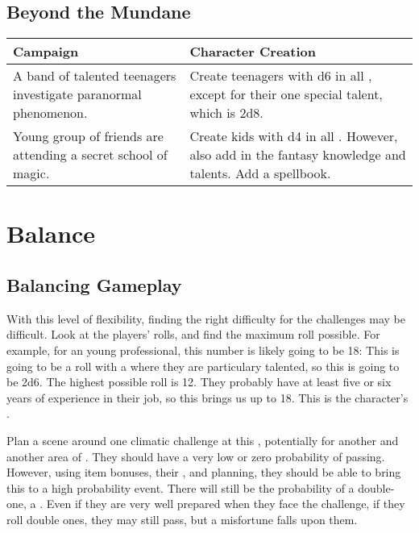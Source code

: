 \documentclass{LegrandOrangeTufteBook}
\begin{document}
\subsection*{Beyond the Mundane}
\begin{center}
	\begin{xltabular}{\textwidth}{XX}
		Campaign & Character Creation \\
		\hline
{}    A band of talented teenagers investigate paranormal phenomenon. & Create teenagers with d6 in all , except for their one special talent, which is 2d8.\\
   				Young group of friends are attending a secret school of magic. & Create kids with d4 in all . However, also add in the fantasy knowledge and talents. Add a spellbook. \\

	\end{xltabular}
\end{center}

\section*{Balance}

\subsection*{Balancing Gameplay}

With this level of flexibility, finding the right difficulty for the challenges may be difficult. Look at the players' rolls, and find the maximum roll possible. For example, for an young professional,
this number is likely going to be 18: This is going to be a roll with a  where they are particulary talented, so this is going to be 2d6. The highest possible roll is 12. They probably have at least five or six years of experience in their job, so this brings us up to 18. This is the character's .

Plan a scene around one climatic challenge at this , potentially for another  and another area of . They should have a very low or zero probability of passing. However, using item bonuses, their , and planning, they should be able to bring this to a high probability event. There will still be the probability of a double-one, a . Even if they are very well prepared when they face the challenge, if they roll double ones, they may still pass, but a misfortune falls upon them.
\end{document}
